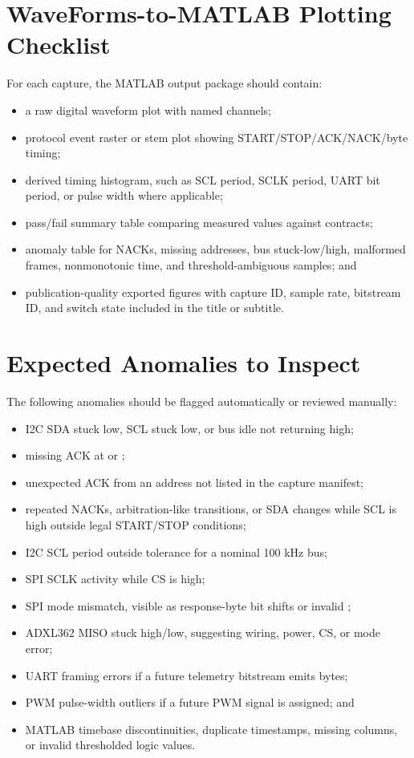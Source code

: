\documentclass[11pt]{article}
\newcommand{\sig}[1]{\texttt{\detokenize{#1}}}
\begin{document}
\appendix

\section{WaveForms-to-MATLAB Plotting Checklist}
\label{app:matlab-checklist}

For each capture, the MATLAB output package should contain:

\begin{itemize}[leftmargin=*]
  \item a raw digital waveform plot with named channels;
  \item protocol event raster or stem plot showing START/STOP/ACK/NACK/byte
        timing;
  \item derived timing histogram, such as SCL period, SCLK period, UART bit
        period, or pulse width where applicable;
  \item pass/fail summary table comparing measured values against contracts;
  \item anomaly table for NACKs, missing addresses, bus stuck-low/high, malformed
        frames, nonmonotonic time, and threshold-ambiguous samples; and
  \item publication-quality exported figures with capture ID, sample rate,
        bitstream ID, and switch state included in the title or subtitle.
\end{itemize}

\section{Expected Anomalies to Inspect}
\label{app:anomalies}

The following anomalies should be flagged automatically or reviewed manually:

\begin{itemize}[leftmargin=*]
  \item I2C SDA stuck low, SCL stuck low, or bus idle not returning high;
  \item missing ACK at \sig{0x47} or \sig{0x30};
  \item unexpected ACK from an address not listed in the capture manifest;
  \item repeated NACKs, arbitration-like transitions, or SDA changes while SCL is
        high outside legal START/STOP conditions;
  \item I2C SCL period outside tolerance for a nominal 100 kHz bus;
  \item SPI SCLK activity while CS is high;
  \item SPI mode mismatch, visible as response-byte bit shifts or invalid
        \sig{PARTID};
  \item ADXL362 MISO stuck high/low, suggesting wiring, power, CS, or mode error;
  \item UART framing errors if a future telemetry bitstream emits bytes;
  \item PWM pulse-width outliers if a future PWM signal is assigned; and
  \item MATLAB timebase discontinuities, duplicate timestamps, missing columns,
        or invalid thresholded logic values.
\end{itemize}
\end{document}
